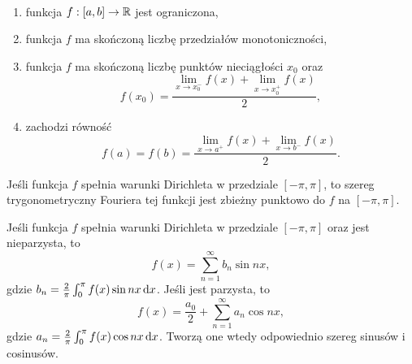 \begin{definition} ~
    \begin{enumerate}
        \item funkcja $f : [a, b] \to \mathbb R$ jest ograniczona,
        \item funkcja $f$ ma skończoną liczbę przedziałów monotoniczności,
        \item funkcja $f$ ma skończoną liczbę punktów nieciągłości $x_0$ oraz
        \[ f(x_0) = \frac{\lim\limits_{x\to x_0^-}f(x) + \lim\limits_{x\to x_0^+}f(x)}{2}, \]
        \item zachodzi równość
        \[ f(a) = f(b) = \frac{\lim\limits_{x\to a^+}f(x) + \lim\limits_{x\to b^-}f(x)}{2}. \]
    \end{enumerate}
\end{definition}

\begin{theorem}
    Jeśli funkcja $f$ spełnia warunki Dirichleta w przedziale $[-\pi, \pi]$, to szereg trygonometryczny Fouriera tej funkcji jest zbieżny punktowo do $f$ na $[-\pi, \pi]$.
\end{theorem}

\begin{remark}
    Jeśli funkcja $f$ spełnia warunki Dirichleta w przedziale $[-\pi, \pi]$ oraz jest nieparzysta, to
    \[ f(x) = \sum_{n=1}^\infty b_n\sin nx, \]
    gdzie $b_n = \frac{2}{\pi}\int_0^\pi f(x)\sin nx \operatorname{d}\!{x}$. Jeśli jest parzysta, to
    \[ f(x) = \frac{a_0}{2} + \sum_{n=1}^\infty a_n\cos nx, \]
    gdzie $a_n = \frac{2}{\pi}\int_0^\pi f(x)\cos nx \operatorname{d}\!{x}$. Tworzą one wtedy odpowiednio szereg sinusów i cosinusów.
\end{remark}

